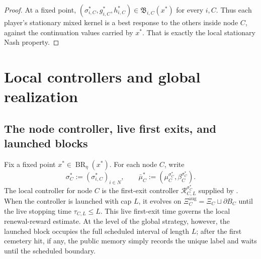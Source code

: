 \documentclass[12pt]{article}
\theoremstyle{definition}
\newcommand{\1}{\mathbf{1}}
\DeclareMathOperator{\BR}{BR}
\begin{document}
\begin{proof}
At a fixed point,
$(\sigma_{i,C}^*,g_{i,C}^*,h_{i,C}^*)\in\mathfrak B_{i,C}(x^*)$ for every $i,C$.
Thus each player's stationary mixed kernel is a best response to the others inside
node $C$, against the continuation values carried by $x^*$. That is exactly the
local stationary Nash property.
\end{proof}

\section{Local controllers and global realization}
\label{sec:realization}


\subsection{The node controller, live first exits, and launched blocks}

Fix a fixed point $x^*\in\BR_\eta(x^*)$. For each node $C$, write
\[
\sigma_C^*:=(\sigma_{i,C}^*)_{i\in N},
\qquad
\bar\mu_C^*:=(\mu_C^{\sigma_C^*},\beta_C^{\sigma_C^*}).
\]
The local controller for node $C$ is the first-exit controller
$\mathcal R_{C,L}^{\sigma_C^*}$ supplied by . When the
controller is launched with cap $L$, it evolves on
$\Xi_C^{\mathrm{aug}}=\Xi_C\sqcup\partial B_C$ until the live stopping time
$\tau_{C,L}\le L$. This live first-exit time governs the local renewal-reward
estimate. At the level of the global strategy, however, the launched block
occupies the full scheduled interval of length $L$; after the first cemetery
hit, if any, the public memory simply records the unique label and waits until
the scheduled boundary.
\end{document}
